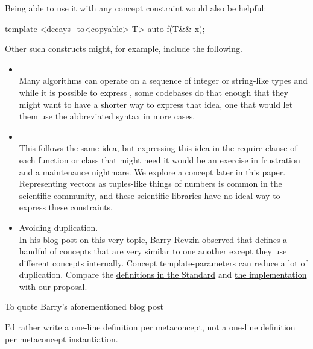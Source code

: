 \documentclass{wg21}
\begin{document}
Being able to use it with any concept constraint would also be helpful:

\begin{colorblock}
template <decays_to<copyable> T>
auto f(T&& x);
\end{colorblock}


Other such constructs might, for example, include the following.
\begin{itemize}
\item {}\\
    Many algorithms can operate on a sequence of integer or string-like types and while it is possible to express
    , some codebases do that enough that they might want to have a shorter way to express that idea,
    one that would let them use the abbreviated syntax in more cases.

\item {} \\
    This follows the same idea, but expressing this idea in the require clause of each function or class that might need it would be an exercise in frustration and a maintenance nightmare. We explore a  concept later in this paper.
    Representing vectors as tuples-like things of numbers is common in the scientific community, and these scientific libraries have no ideal way to express these constraints.

\item Avoiding duplication.\\
    In his \href{https://brevzin.github.io/c++/2019/01/09/concept-templates/}{blog post} on this very topic, Barry Revzin observed that  defines a handful of concepts that are very
    similar to one another except they use different concepts internally. Concept template-parameters can reduce a lot of duplication.
    Compare the \href{https://eel.is/c++draft/indirectcallable.indirectinvocable}{definitions in the Standard} and \href{https://godbolt.org/z/ohKsoKh9G}{the implementation with our proposal}.
\end{itemize}

To quote Barry's aforementioned blog post

\begin{quoteblock}
I’d rather write a one-line definition per metaconcept, not a one-line definition per metaconcept instantiation.
\end{quoteblock}
\end{document}

